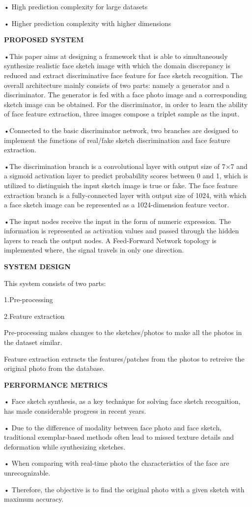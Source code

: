 \documentclass[journal]{IEEEtran} %
\begin{document}
•	High prediction complexity for large datasets

•	Higher prediction complexity with higher dimensions

\textbf{PROPOSED SYSTEM}

•This paper aims at designing a framework that is able to simultaneously synthesize realistic face sketch image with which the domain discrepancy is reduced and extract discriminative face feature for face sketch recognition. The overall architecture mainly consists of two parts: namely a generator and a discriminator. The generator is fed with a face photo image and a corresponding sketch image can be obtained. For the discriminator, in order to learn the ability of face feature extraction, three images compose a triplet sample as the input.

•Connected to the basic discriminator network, two branches are designed to implement the functions of real/fake sketch discrimination and face feature extraction. 

•The discrimination branch is a convolutional layer with output size of 7×7 and a sigmoid activation layer to predict probability scores between 0 and 1, which is utilized to distinguish the input sketch image is true or fake. The face feature extraction branch is a fully-connected layer with output size of 1024, with which a face sketch image can be represented as a 1024-dimension feature vector. 

•The input nodes receive the input in the form of numeric expression. The information is represented as activation values and passed through the hidden layers to reach the output nodes. A Feed-Forward Network topology is implemented where, the signal travels in only one direction. 

\textbf{SYSTEM DESIGN}

This system consists of two parts:

                   1.Pre-processing
                   
                   2.Feature extraction                   

Pre-processing makes changes to the sketches/photos to make all the photos in the dataset similar.

Feature extraction extracts the features/patches from the photos to retreive the original photo from the database.

\textbf{PERFORMANCE METRICS}

•	Face sketch synthesis, as a key technique for solving face sketch recognition, has made considerable progress in recent years. 

•	Due to the difference of modality between face photo and face sketch, traditional exemplar-based methods often lead to missed texture details and deformation while synthesizing sketches. 

•	When comparing with real-time photo the characteristics of the face are unrecognizable.

•	Therefore, the objective is to find the original photo with a given sketch with maximum accuracy.
\end{document}

